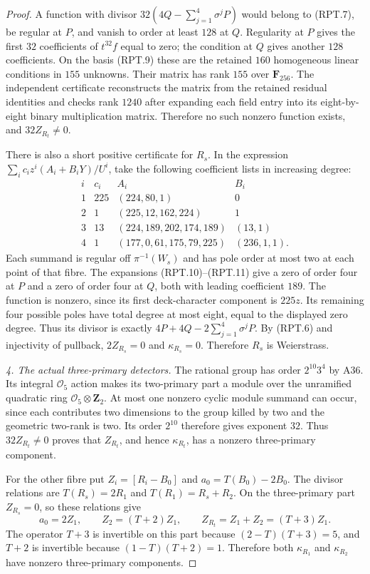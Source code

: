 \begin{proof}
A function with divisor
$32(4Q-\sum_{j=1}^4\sigma^jP)$ would belong to (RPT.7), be
regular at $P$, and vanish to order at least $128$ at $Q$.
Regularity at $P$ gives the first $32$ coefficients of
$t^{32}f$ equal to zero; the condition at $Q$ gives another
$128$ coefficients. On the basis (RPT.9) these are the
retained $160$ homogeneous linear conditions in $155$
unknowns. Their matrix has rank $155$ over $\mathbf F_{256}$.
The independent certificate reconstructs the matrix from the
retained residual identities and checks rank $1240$ after
expanding each field entry into its eight-by-eight binary
multiplication matrix. Therefore no such nonzero function
exists, and $32Z_{R_t}\ne0$.

There is also a short positive certificate for $R_s$.
In the expression $\sum_i c_i z^i(A_i+B_iY)/U^i$, take
the following coefficient lists in increasing degree:
\[
\begin{array}{c|c|l|l}
 i&c_i&A_i&B_i\\\hline
 1&225&(224,80,1)&0\\
 2&1&(225,12,162,224)&1\\
 3&13&(224,189,202,174,189)&(13,1)\\
 4&1&(177,0,61,175,79,225)&(236,1,1).
\end{array}
 \tag{RPT.12}
\]
Each summand is regular off $\pi^{-1}(W_s)$ and has pole
order at most two at each point of that fibre. The expansions
(RPT.10)--(RPT.11) give a zero of order four at $P$ and a zero
of order four at $Q$, both with leading coefficient $189$.
The function is nonzero, since its first deck-character
component is $225z$. Its remaining four possible poles have
total degree at most eight, equal to the displayed zero
degree. Thus its divisor is exactly
$4P+4Q-2\sum_{j=1}^4\sigma^jP$.
By (RPT.6) and injectivity of pullback, $2Z_{R_s}=0$ and
$\kappa_{R_s}=0$. Therefore $R_s$ is Weierstrass.

\emph{4. The actual three-primary detectors.}
The rational group has order $2^{10}3^4$ by A36. Its integral
$\mathcal O_5$ action makes its two-primary part a module over
the unramified quadratic ring $\mathcal O_5\otimes\mathbf Z_2$.
At most one nonzero cyclic module summand can occur, since
each contributes two dimensions to the group killed by two
and the geometric two-rank is two. Its order $2^{10}$
therefore gives exponent $32$. Thus $32Z_{R_t}\ne0$ proves
that $Z_{R_t}$, and hence $\kappa_{R_t}$, has a nonzero
three-primary component.

For the other fibre put $Z_i=[R_i-B_0]$ and
$a_0=T(B_0)-2B_0$. The divisor relations are
$T(R_s)=2R_1$ and $T(R_1)=R_s+R_2$.
On the three-primary part $Z_{R_s}=0$, so these relations
give
\[
 a_0=2Z_1,\qquad Z_2=(T+2)Z_1,\qquad
                  Z_{R_t}=Z_1+Z_2=(T+3)Z_1.
 \tag{RPT.13}
\]
The operator $T+3$ is invertible on this part because
$(2-T)(T+3)=5$, and $T+2$ is invertible because
$(1-T)(T+2)=1$. Therefore both $\kappa_{R_1}$ and
$\kappa_{R_2}$ have nonzero three-primary components.


\end{proof}
